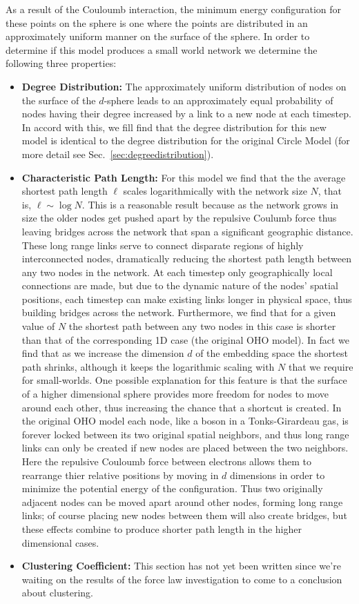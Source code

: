 \documentclass[aps,pre,reprint,superscriptaddress,amsmath,amssymb,nofootinbib]{revtex4-1}
\begin{document}
As a result of the Couloumb interaction, the minimum energy configuration for these points on the sphere is one where the points are distributed in an approximately uniform manner on the surface of the sphere.
In order to determine if this model produces a small world network we determine the following three properties:
\begin{itemize}
  \item \textbf{Degree Distribution:} The approximately uniform distribution of nodes on the surface of the $d$-sphere leads to an approximately equal probability of nodes having their degree increased by a link to a new node at each timestep.
In accord with this, we fill find that the degree distribution for this new model is identical to the degree distribution for the original Circle Model (for more detail see Sec.~\ref{sec:degreedistribution}).
  \item \textbf{Characteristic Path Length:} For this model we find that the the average shortest path length $\ell$ scales logarithmically with the network size $N$, that is, $\ell \sim \log N$. 
This is a reasonable result because as the network grows in size the older nodes get pushed apart by the repulsive Coulumb force thus leaving bridges across the network that span a significant geographic distance.
These long range links serve to connect disparate regions of highly interconnected nodes, dramatically reducing the shortest path length between any two nodes in the network.
At each timestep only geographically local connections are made, but due to the dynamic nature of the nodes' spatial positions, each timestep can make existing links longer in physical space, thus building bridges across the network.
Furthermore, we find that for a given value of $N$ the shortest path between any two nodes in this case is shorter than that of the corresponding 1D case (the original OHO model).
In fact we find that as we increase the dimension $d$ of the embedding space the shortest path shrinks, although it keeps the logarithmic scaling with $N$ that we require for small-worlds.
One possible explanation for this feature is that the surface of a higher dimensional sphere provides more freedom for nodes to move around each other, thus increasing the chance that a shortcut is created.
In the original OHO model each node, like a boson in a Tonks-Girardeau gas, is forever locked between its two original spatial neighbors, and thus long range links can only be created if new nodes are placed between the two neighbors.
Here the repulsive Couloumb force between electrons allows them to rearrange thier relative positions by moving in $d$ dimensions in order to minimize the potential energy of the configuration.
Thus two originally adjacent nodes can be moved apart around other nodes, forming long range links; of course placing new nodes between them will also create bridges, but these effects combine to produce shorter path length in the higher dimensional cases.
  \item \textbf{Clustering Coefficient:} This section has not yet been written since we're waiting on the results of the force law investigation to come to a conclusion about clustering. 
\end{itemize}
\end{document}
